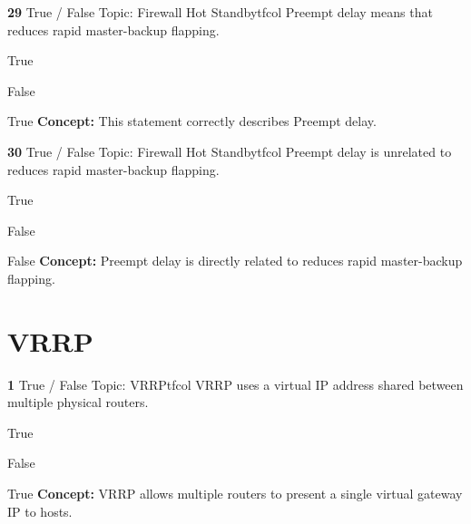 \documentclass[10pt,a4paper]{article}
\begin{document}
\begin{qcard}{\color{white}\textbf{29} \hfill \small True / False \textbar{} Topic: Firewall Hot Standby}{tfcol}
Preempt delay means that reduces rapid master-backup flapping.

\begin{qoptions}
\item True
\item False
\end{qoptions}
\begin{explainbox}{True}
\textbf{Concept:} This statement correctly describes Preempt delay.
\end{explainbox}
\end{qcard}

\begin{qcard}{\color{white}\textbf{30} \hfill \small True / False \textbar{} Topic: Firewall Hot Standby}{tfcol}
Preempt delay is unrelated to reduces rapid master-backup flapping.

\begin{qoptions}
\item True
\item False
\end{qoptions}
\begin{explainbox}{False}
\textbf{Concept:} Preempt delay is directly related to reduces rapid master-backup flapping.
\end{explainbox}
\end{qcard}

\section{VRRP}
\begin{qcard}{\color{white}\textbf{1} \hfill \small True / False \textbar{} Topic: VRRP}{tfcol}
VRRP uses a virtual IP address shared between multiple physical routers.

\begin{qoptions}
\item True
\item False
\end{qoptions}
\begin{explainbox}{True}
\textbf{Concept:} VRRP allows multiple routers to present a single virtual gateway IP to hosts.
\end{explainbox}
\end{qcard}
\end{document}
